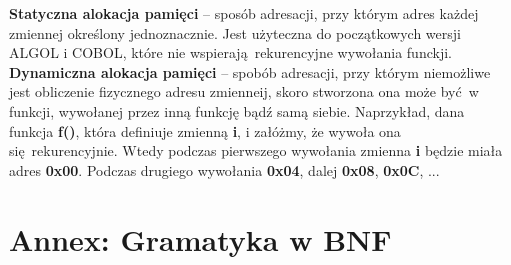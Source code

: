 \documentclass[leqno, 12pt]{article}
\begin{document}
		\textbf{Statyczna alokacja pamięci} -- sposób adresacji, przy którym adres każdej zmiennej określony
		jednoznacznie. Jest użyteczna do początkowych wersji ALGOL i COBOL, które nie wspierają rekurencyjne
		wywołania funckji.
		\\
		
		\textbf{Dynamiczna alokacja pamięci} -- spobób adresacji, przy którym niemożliwe jest obliczenie
		fizycznego adresu zmienneij, skoro stworzona ona może być w funkcji, wywołanej przez inną funkcję
		bądź samą siebie. Naprzykład, dana funkcja \textbf{f()}, która definiuje zmienną \textbf{i}, i
		załóżmy, że wywoła ona się rekurencyjnie. Wtedy podczas pierwszego wywołania zmienna \textbf{i}
		będzie miała adres \textbf{0x00}. Podczas drugiego wywołania \textbf{0x04}, dalej \textbf{0x08},
		\textbf{0x0C}, ...

		\newpage

	\section{Annex: Gramatyka w BNF}

        \setlength{\grammarindent}{12em}
\end{document}
